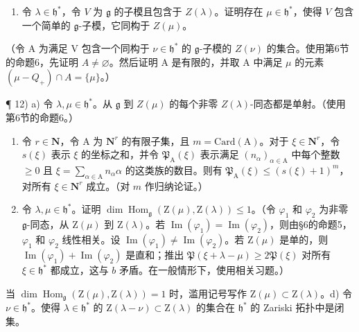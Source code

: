 \begin{enumerate}
\def\labelenumi{\arabic{enumi})}
\setcounter{enumi}{10}
\tightlist
\item
  令 \(\lambda \in \mathfrak{h}^*\)，令 \(V\) 为 \(\mathfrak{g}\) 的子模且包含于 \(Z(\lambda)\)。证明存在 \(\mu \in \mathfrak{h}^*\)，使得 \(V\) 包含一个简单的 \(\mathfrak{g}\)-子模，它同构于 \(Z(\mu)\)。
\end{enumerate}

（令 A 为满足 V 包含一个同构于 \(\nu \in \mathfrak{h}^*\) 的 \(\mathfrak{g}\)-子模的 \(Z(\nu)\) 的集合。使用第6节的命题6，先证明 \(A \neq \varnothing\)。然后证明 A 是有限的，并取 A 中满足 \(\mu\) 的元素 \((\mu - Q_{+}) \cap A = \{\mu\}\)。）

¶ 12) a) 令 \(\lambda, \mu \in \mathfrak{h}^*\)。从 \(\mathfrak{g}\) 到 \(Z(\mu)\) 的每个非零 \(Z(\lambda)\)-同态都是单射。（使用第6节的命题6。）

\begin{enumerate}
\def\labelenumi{\alph{enumi})}
\setcounter{enumi}{1}
\item
  令 \(r \in \mathbf{N}\)，令 A 为 \(\mathbf{N}^r\) 的有限子集，且 \(m = \mathrm{Card}(\mathrm{A})\)。对于 \(\xi \in \mathbf{N}^r\)，令 \(s(\xi)\) 表示 \(\xi\) 的坐标之和，并令 \(\mathfrak{P}_{\mathrm{A}}(\xi)\) 表示满足 \((n_{\alpha})_{\alpha \in \mathrm{A}}\) 中每个整数 \(\geq 0\) 且 \(\xi = \sum_{\alpha \in \mathrm{A}} n_{\alpha}\alpha\) 的这类族的数目。则有 \(\mathfrak{P}_{\mathrm{A}}(\xi) \leq (s(\xi) + 1)^m\)，对所有 \(\xi \in \mathbf{N}^r\) 成立。（对 \(m\) 作归纳论证。）
\item
  令 \(\lambda, \mu \in \mathfrak{h}^*\)。证明 \(\dim \operatorname{Hom}_{\mathfrak{g}}(\mathrm{Z}(\mu), \mathrm{Z}(\lambda)) \leq 1\)。（令 \(\varphi_1\) 和 \(\varphi_2\) 为非零 \(\mathfrak{g}\)-同态，从 \(\mathrm{Z}(\mu)\) 到 \(\mathrm{Z}(\lambda)\)。若 \(\operatorname{Im}(\varphi_1) = \operatorname{Im}(\varphi_2)\)，则由§6的命题5，\(\varphi_1\) 和 \(\varphi_2\) 线性相关。设 \(\operatorname{Im}(\varphi_1) \neq \operatorname{Im}(\varphi_2)\)。若 \(\mathrm{Z}(\mu)\) 是单的，则 \(\operatorname{Im}(\varphi_1) + \operatorname{Im}(\varphi_2)\) 是直和；推出 \(\mathfrak{P}(\xi + \lambda - \mu) \geq 2\mathfrak{P}(\xi)\) 对所有 \(\xi \in \mathfrak{h}^*\) 都成立，这与 \(b\) 矛盾。在一般情形下，使用相关习题。）
\end{enumerate}

当 \(\dim\operatorname{Hom}_{\mathfrak{g}}(\mathrm{Z}(\mu),\mathrm{Z}(\lambda))=1\) 时，滥用记号写作 \(\mathrm{Z}(\mu)\subset\mathrm{Z}(\lambda)\)。d) 令 \(\nu\in\mathfrak{h}^{*}\)。使得 \(\lambda\in\mathfrak{h}^{*}\) 的 \(\mathrm{Z}(\lambda-\nu)\subset\mathrm{Z}(\lambda)\) 的集合在 \(\mathfrak{h}^{*}\) 的 Zariski 拓扑中是闭集。

